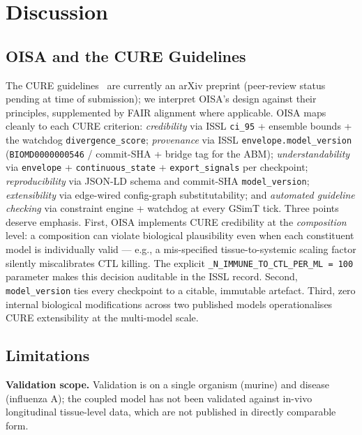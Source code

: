 \documentclass[conference,letterpaper,10pt]{IEEEtran}
\begin{document}
\section{Discussion}

\subsection{OISA and the CURE Guidelines}
The CURE guidelines~\cite{sauro2025cure} are currently an arXiv
preprint (peer-review status pending at time of submission); we
interpret OISA's design against their principles, supplemented by FAIR
alignment where applicable. OISA maps cleanly to each CURE criterion:
\emph{credibility} via ISSL \texttt{ci\_95} + ensemble bounds + the
watchdog \texttt{divergence\_score};
\emph{provenance} via ISSL \texttt{envelope.model\_version}
(\texttt{BIOMD0000000546} / commit-SHA + bridge tag for the ABM);
\emph{understandability} via \texttt{envelope} +
\texttt{continuous\_state} + \texttt{export\_signals} per checkpoint;
\emph{reproducibility} via JSON-LD schema and commit-SHA
\texttt{model\_version}; \emph{extensibility} via edge-wired
config-graph substitutability; and \emph{automated guideline checking}
via constraint engine + watchdog at every GSimT tick.
Three points deserve emphasis. First, OISA implements CURE credibility
at the \emph{composition} level: a composition can violate biological
plausibility even when each constituent model is individually valid ---
e.g., a mis-specified tissue-to-systemic scaling factor silently
miscalibrates CTL killing. The explicit
\texttt{\_N\_IMMUNE\_TO\_CTL\_PER\_ML = 100} parameter makes this
decision auditable in the ISSL record. Second, \texttt{model\_version}
ties every checkpoint to a citable, immutable artefact. Third, zero
internal biological modifications across two published models
operationalises CURE extensibility at the multi-model scale.

\subsection{Limitations}

\textbf{Validation scope.} Validation is on a single organism (murine)
and disease (influenza A); the coupled model has not been validated
against in-vivo longitudinal tissue-level data, which are not
published in directly comparable form.
\end{document}
